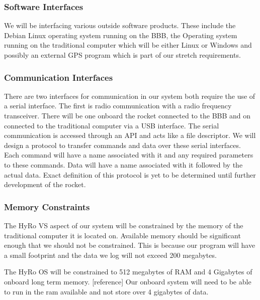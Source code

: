 \documentclass[10pt,draftclsnofoot,onecolumn]{IEEEtran}
\begin{document}
\subsubsection{Software Interfaces}
	We will be interfacing various outside software products. These include the Debian Linux operating system running on the BBB, the Operating system running on the traditional computer which will be either Linux or Windows and possibly an external GPS program which is part of our stretch requirements.

\subsubsection{Communication Interfaces}
There are two interfaces for communication in our system both require the use of a serial interface. The first is radio communication with a radio frequency transceiver. There will be one onboard the rocket connected to the BBB and on connected to the traditional computer via a USB interface. The serial communication is accessed through an API and acts like a file descriptor. We will design a protocol to transfer commands and data over these serial interfaces. Each command will have a name associated with it and any required parameters to these commands. Data will have a name associated with it followed by the actual data. Exact definition of this protocol is yet to be determined until further development of the rocket.
\subsubsection{Memory Constraints}
The HyRo VS aspect of our system will be constrained by the memory of the traditional computer it is located on. Available memory should be significant enough that we should not be constrained. This is because our program will have a small footprint and the data we log will not exceed 200 megabytes.\par 
	The HyRo OS will be constrained to 512 megabytes of RAM and 4 Gigabytes of onboard long term memory. [reference] Our onboard system will need to be able to run in the ram available and not store over 4 gigabytes of data.
\end{document}
